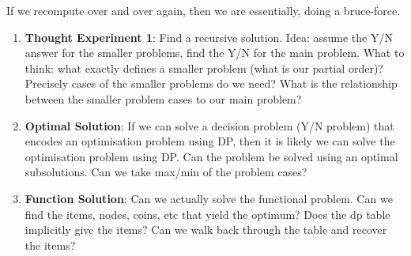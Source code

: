 If we recompute over and over again, then we are essentially, 
doing a bruce-force. 

\begin{enumerate}
\item \textbf{Thought Experiment 1}: Find a recursive solution. 
Idea: assume the Y/N answer for the smaller problems, find 
the Y/N for the main problem. What to think: 
what exactly defines a smaller problem (what is our partial order)? 
Precisely cases of the smaller problems do we need? 
What is the relationship between the smaller problem cases to our main problem?
\item \textbf{Optimal Solution}: If we can solve a decision problem (Y/N problem)
that encodes an optimisation problem using DP, then it is likely 
we can solve the optimisation problem using DP. Can the problem be solved 
using an optimal subsolutions. Can we take max/min of the problem cases? 
\item \textbf{Function Solution}: Can we actually solve the functional 
problem. Can we find the items, nodes, coins, etc that yield the optimum?
Does the dp table implicitly give the items? Can we walk back through 
the table and recover the items?
\end{enumerate}